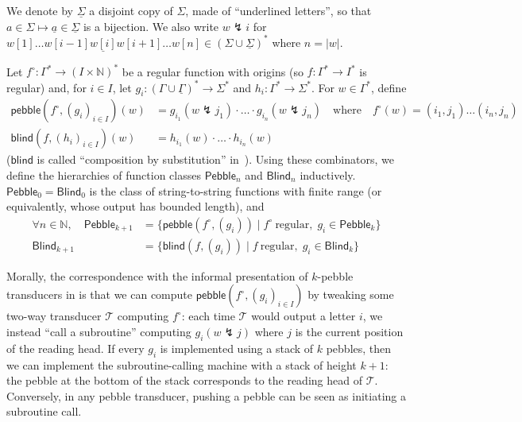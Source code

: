 \documentclass{fundam}
\newcommand{\bbN}{\mathbb{N}}
\newcommand{\pebble}{\mathsf{pebble}}
\newcommand{\blind}{\mathsf{blind}}
\newcommand{\Pebble}{\mathsf{Pebble}}
\newcommand{\Blind}{\mathsf{Blind}}
\theoremstyle{claimstyle}
\newcommand\withul{\lightning}
\begin{document}
We denote by $\underline\Sigma$ a disjoint copy of $\Sigma$,
made of \enquote{underlined letters}, so that $a \in \Sigma \mapsto
\underline{a} \in \underline\Sigma$ is a bijection. We also write
$w\withul i$ for $w[1]\ldots w[i-1] \underline{w[i]} w[i+1]\ldots w[n] \in
(\Sigma \cup \underline\Sigma)^*$ where $n = |w|$.

\begin{definition}
  Let $f^\circ \colon \Gamma^* \to (I\times\bbN)^{*}$ be a regular function with origins
 (so $f: \Gamma^* \to I^{*}$ is regular) and, for $i \in I$, let $g_{i} \colon (\Gamma \cup \underline\Gamma)^{*} \to \Sigma^{*}$ and $h_i \colon \Gamma^* \to \Sigma^*$. For $w \in \Gamma^*$, define
  \begin{align*}
     \pebble(f^\circ,(g_{i})_{i\in I})(w) &= g_{i_{1}}(w\withul j_{1}) \cdot \ldots \cdot g_{i_{n}}(w\withul j_{n}) \quad\mathrm{where}\quad f^\circ(w) = (i_{1},j_{1}) \dots (i_{n},j_{n})\\
     \blind(f,(h_{i})_{i\in I})(w) &= h_{i_{1}}(w) \cdot \ldots \cdot h_{i_{n}}(w)
  \end{align*}
  ($\mathsf{blind}$ is called \enquote{composition by substitution} in~\cite[\S4]{NguyenNP21}). Using these combinators, we define the hierarchies of function classes $\Pebble_n$ and $\Blind_n$ inductively.
  $\Pebble_0 = \Blind_0$ is the class of string-to-string functions with finite range (or equivalently, whose output has bounded length), and
  \begin{align*}
    \forall n\in\bbN,\quad \Pebble_{k+1} &= \{ \pebble(f^\circ, (g_i)) \mid f^\circ\ \text{regular},\; g_i \in \Pebble_k\}\\
     \Blind_{k+1} &= \{  \blind(f, (g_i)) \mid f\ \text{regular},\; g_i \in \Blind_k\}
  \end{align*}
\end{definition}

Morally, the correspondence with the informal presentation of $k$-pebble
transducers in  is that we can compute
$\pebble(f^\circ,(g_{i})_{i\in I})$ by tweaking some two-way transducer
$\mathcal{T}$ computing $f^\circ$: each time $\mathcal{T}$ would output a letter
$i$, we instead \enquote{call a subroutine} computing $g_i(w\withul j)$ where
$j$ is the current position of the reading head. If every $g_i$ is implemented
using a stack of $k$ pebbles, then we can implement the subroutine-calling
machine with a stack of height $k+1$: the pebble at the bottom of the stack
corresponds to the reading head of $\mathcal{T}$. Conversely, in any pebble
transducer, pushing a pebble can be seen as initiating a subroutine call.
\end{document}
